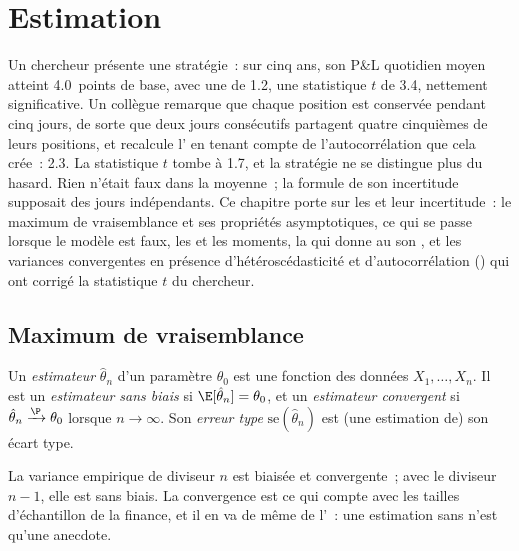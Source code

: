 \chapter{Estimation}\label{ch:qm:estimation}

Un chercheur présente une stratégie~: sur cinq ans, son P\&L quotidien moyen atteint 4.0~points de base, avec une
 de 1.2, une statistique $t$ de 3.4, nettement significative. Un collègue remarque que
chaque position est conservée pendant cinq jours, de sorte que deux jours consécutifs partagent quatre cinquièmes de leurs
positions, et recalcule l' en tenant compte de l'autocorrélation que cela crée~: 2.3.
La statistique $t$ tombe à 1.7, et la stratégie ne se distingue plus du hasard. Rien
n'était faux dans la moyenne~; la formule de son incertitude supposait des jours indépendants. Ce chapitre
porte sur les  et leur incertitude~: le maximum de vraisemblance et ses propriétés asymptotiques, ce qui se passe
lorsque le modèle est faux, les  et les moments, la  qui donne au  son
, et les variances convergentes en présence d'hétéroscédasticité et d'autocorrélation () qui ont corrigé
la statistique $t$ du chercheur.

\section{Maximum de vraisemblance}

\begin{definition}\label{def:qm:estimation:estimator}
Un \emph{estimateur} $\hat\theta_n$ d'un paramètre $\theta_0$ est une fonction des données $X_1, \dots, X_n$. Il est un
\emph{estimateur sans biais} si $\E[\hat\theta_n] = \theta_0$, et un \emph{estimateur
convergent} si $\hat\theta_n \xrightarrow{\P} \theta_0$ lorsque $n \to \infty$. Son \emph{erreur
type} $\mathrm{se}(\hat\theta_n)$ est (une estimation de) son écart type.
\end{definition}

La variance empirique de diviseur $n$ est biaisée et convergente~; avec le diviseur $n - 1$, elle est sans biais. La convergence
est ce qui compte avec les tailles d'échantillon de la finance, et il en va de même de l'~: une estimation sans 
n'est qu'une anecdote.

